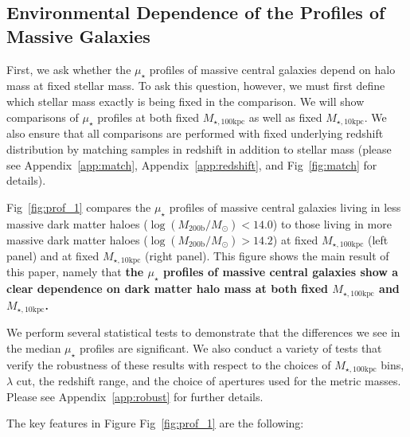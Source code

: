 \documentclass[a4paper,fleqn,usenatbib]{mnras}
\def\logmh{{$\log (M_{\mathrm{200b}}/M_{\odot})$}}
\def\minn{{$M_{\star,10\mathrm{kpc}}$}}
\def\mtot{{$M_{\star,100\mathrm{kpc}}$}}
\def\mden{{$\mu_{\star}$}}
\begin{document}
\subsection{Environmental Dependence of the Profiles of Massive Galaxies}
    \label{ssec:sbp_mtot} 
       
    First, we ask whether the \mden{} profiles of massive central galaxies depend on 
    halo mass at fixed stellar mass. 
    To ask this question, however, we must first define which stellar mass exactly is 
    being fixed in the comparison. 
    We will show comparisons of \mden{} profiles at both fixed \mtot{} as well as fixed 
    \minn{}. 
    We also ensure that all comparisons are performed with fixed underlying redshift
    distribution by matching samples in redshift in addition to stellar mass
    (please see Appendix~\ref{app:match}, Appendix~\ref{app:redshift}, 
    and Fig~\ref{fig:match} for details). 
    
   
    Fig~\ref{fig:prof_1} compares the \mden{} profiles of massive central galaxies 
    living in less massive dark matter haloes (\logmh$<14.0$) to those living in more 
    massive dark matter haloes (\logmh$>14.2$) at fixed \mtot{} (left panel) and at 
    fixed \minn{} (right panel). 
    This figure shows the main result of this paper, namely that 
    \textbf{the \mden{} profiles of massive central galaxies show a clear dependence on 
    dark matter halo mass at both fixed \mtot{} and \minn{}.}

    We perform several statistical tests to demonstrate that the differences we see in 
    the median \mden{} profiles are significant. 
    We also conduct a variety of tests that verify the robustness of these results with
    respect to the choices of \mtot{} bins, $\lambda$ cut, the redshift range, and the 
    choice of apertures used for the metric masses. 
    Please see Appendix~\ref{app:robust} for further details.
   
    The key features in Figure Fig~\ref{fig:prof_1} are the following:
    
\end{document}
